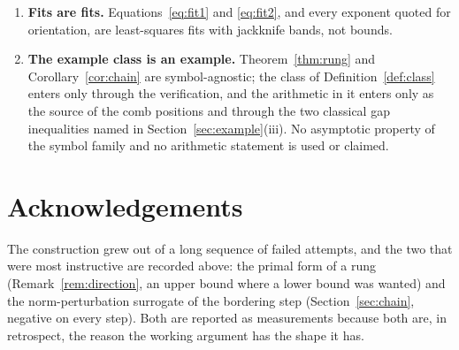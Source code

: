\documentclass[11pt,a4paper]{article}
\theoremstyle{plain}
\theoremstyle{definition}
\begin{document}
\begin{enumerate}[label=\textup{(L\arabic*)},leftmargin=3.2em]
  Poincar\'e step in the spirit of \cite{PayneWeinberger1960} followed by a
  Cauchy--Schwarz reduction to the corner mass --- which requires a sign
  hypothesis on the increment sequence and a summed Harnack-type ratio bound. Both
  hold on the windows we measured and neither is proved uniformly; their classical
  address is the corner regularity of inverses of Toeplitz forms with singular symbols
  \cite{Widom1974,FisherHartwig1969,Trench1964} for the ratio, and the discrete
  maximum principle for monotone matrices \cite{Ostrowski1937,Varga1962} for the sign.
  Since that route is logically independent of Theorem~\ref{thm:rung} and
  Corollary~\ref{cor:chain}, which do not use it, we omit it here and defer it to a
  separate note whose subject is a discrete Harnack inequality for the increments of
  the inverse.
\item\label{L:fits} \textbf{Fits are fits.} Equations~\eqref{eq:fit1} and
  \eqref{eq:fit2}, and every exponent quoted for orientation, are least-squares fits
  with jackknife bands, not bounds.
\item\label{L:example} \textbf{The example class is an example.}
  Theorem~\ref{thm:rung} and Corollary~\ref{cor:chain} are symbol-agnostic; the class
  of Definition~\ref{def:class} enters only through the verification, and the
  arithmetic in it enters only as the source of the comb positions and through the two
  classical gap inequalities named in Section~\ref{sec:example}(iii). No asymptotic
  property of the symbol family and no arithmetic statement is used or claimed.
\end{enumerate}

\section*{Acknowledgements}

The construction grew out of a long sequence of failed attempts, and the two that
were most instructive are recorded above: the primal form of a rung
(Remark~\ref{rem:direction}, an upper bound where a lower bound was wanted) and the
norm-perturbation surrogate of the bordering step
(Section~\ref{sec:chain}, negative on every step). Both are reported as measurements
because both are, in retrospect, the reason the working argument has the shape it has.
\end{document}
